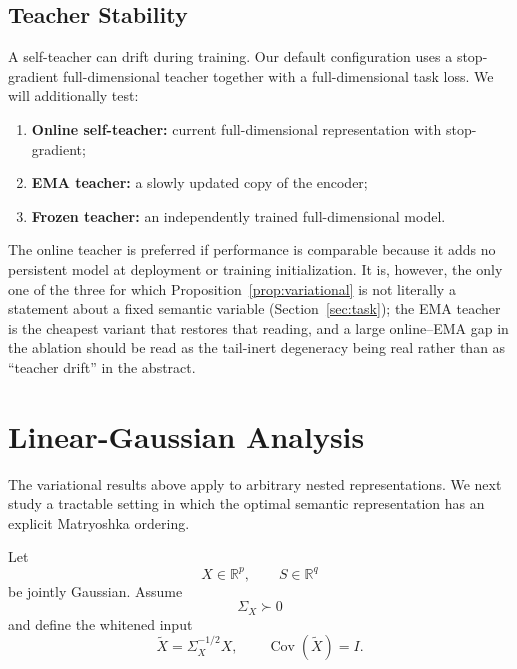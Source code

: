 \documentclass[11pt]{article}
\newcommand{\R}{\mathbb{R}}
\begin{document}
\subsection{Teacher Stability}
\label{sec:teacher}

A self-teacher can drift during training.
Our default configuration uses a stop-gradient full-dimensional teacher together with a full-dimensional task loss.
We will additionally test:

\begin{enumerate}[leftmargin=1.5em]
    \item \textbf{Online self-teacher:}
    current full-dimensional representation with stop-gradient;

    \item \textbf{EMA teacher:}
    a slowly updated copy of the encoder;

    \item \textbf{Frozen teacher:}
    an independently trained full-dimensional model.
\end{enumerate}

The online teacher is preferred if performance is comparable because it adds no persistent model at deployment or training initialization.
It is, however, the only one of the three for which Proposition~\ref{prop:variational} is not literally a statement about a fixed semantic variable (Section~\ref{sec:task}); the EMA teacher is the cheapest variant that restores that reading, and a large online--EMA gap in the ablation should be read as the tail-inert degeneracy being real rather than as ``teacher drift'' in the abstract.


\section{Linear-Gaussian Analysis}

The variational results above apply to arbitrary nested representations.
We next study a tractable setting in which the optimal semantic representation has an explicit Matryoshka ordering.

Let
\begin{equation}
    X\in\R^p,
    \qquad
    S\in\R^q
\end{equation}
be jointly Gaussian.
Assume
\begin{equation}
    \Sigma_X\succ0
\end{equation}
and define the whitened input
\begin{equation}
    \widetilde X
    =
    \Sigma_X^{-1/2}X,
    \qquad
    \operatorname{Cov}(\widetilde X)=I.
\end{equation}
\end{document}
